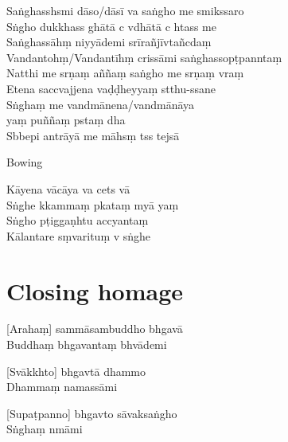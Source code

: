 \enlargethispage{\baselineskip}
\clearpage

Saṅghasshsmi dāso/dāsī va saṅgho me smikssaro\\%
Sṅgho dukkhass ghātā c vdhātā c htass me\\
Saṅghassāhṃ niyyādemi srīrañjīvtañcdaṃ\\
Vandantohṃ/Vandantīhṃ crissāmi saṅghassopṭpanntaṃ\\
Natthi me srṇaṃ aññaṃ saṅgho me srṇaṃ vraṃ\\
Etena saccvajjena vaḍḍheyyaṃ stthu-ssane\\
Sṅghaṃ me vandmānena/vandmānāya\\
\vin yaṃ puññaṃ pstaṃ dha\\
Sbbepi antrāyā me māhsṃ tss tejsā

\begin{instruction}
  Bowing
\end{instruction}

Kāyena vācāya va cets vā\\
Sṅghe kkammaṃ pkataṃ myā yaṃ\\
Sṅgho pṭiggaṇhtu accyantaṃ\\
Kālantare sṃvarituṃ v sṅghe

\chapter{Closing homage}%

[Arahaṃ] sammāsambuddho bhgavā\\
Buddhaṃ bhgavantaṃ bhvādemi 

[Svākkhto] bhgavtā dhammo\\
Dhammaṃ namassāmi 

[Supaṭpanno] bhgavto sāvaksaṅgho\\
Sṅghaṃ nmāmi 

\clearpage


